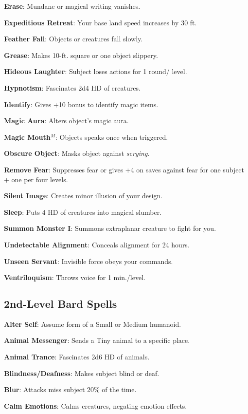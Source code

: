 \textbf{Erase}: Mundane or magical writing vanishes.

\textbf{Expeditious Retreat}: Your base land speed increases by 30 ft.

\textbf{Feather Fall}: Objects or creatures fall slowly.

\textbf{Grease}: Makes 10-ft. square or one object slippery.

\textbf{Hideous Laughter}: Subject loses actions for 1 round/ level.

\textbf{Hypnotism}: Fascinates 2d4 HD of creatures.

\textbf{Identify}: Gives +10 bonus to identify magic items.

\textbf{Magic Aura}: Alters object's magic aura.

\textbf{Magic Mouth}\(^{M}\): Objects speaks once when triggered.

\textbf{Obscure Object}: Masks object against \textit{scrying}.

\textbf{Remove Fear}: Suppresses fear or gives +4 on saves against fear for one subject + one per four levels.

\textbf{Silent Image}: Creates minor illusion of your design.

\textbf{Sleep}: Puts 4 HD of creatures into magical slumber.

\textbf{Summon Monster I}: Summons extraplanar creature to fight for you.

\textbf{Undetectable Alignment}: Conceals alignment for 24 hours.

\textbf{Unseen Servant}: Invisible force obeys your commands.

\textbf{Ventriloquism}: Throws voice for 1 min./level.

\subsection{2nd-Level Bard Spells}


\textbf{Alter Self}: Assume form of a Small or Medium humanoid.

\textbf{Animal Messenger}: Sends a Tiny animal to a specific place.

\textbf{Animal Trance}: Fascinates 2d6 HD of animals.

\textbf{Blindness/Deafness}: Makes subject blind or deaf.

\textbf{Blur}: Attacks miss subject 20\% of the time.

\textbf{Calm Emotions}: Calms creatures, negating emotion effects.

